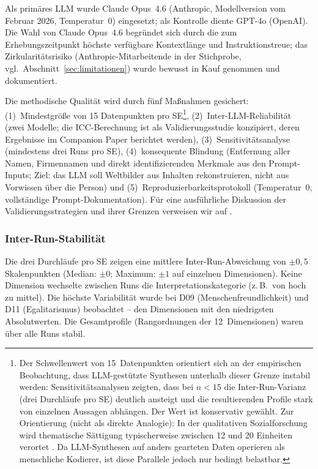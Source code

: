 \documentclass[12pt,a4paper]{article}
\begin{document}
Als prim\"ares LLM wurde Claude Opus~4.6 (Anthropic, Modellversion vom Februar 2026, Temperatur~0) eingesetzt; als Kontrolle diente GPT-4o (OpenAI). Die Wahl von Claude Opus~4.6 begr\"undet sich durch die zum Erhebungszeitpunkt h\"ochste verf\"ugbare Kontextl\"ange und Instruktionstreue; das Zirkularit\"atsrisiko (Anthropic-Mitarbeitende in der Stichprobe, vgl.\ Abschnitt~\ref{sec:limitationen}) wurde bewusst in Kauf genommen und dokumentiert.

Die methodische Qualit\"at wird durch f\"unf Ma\ss{}nahmen gesichert: (1)~Mindestgr\"o\ss{}e von 15 Datenpunkten pro SE\footnote{Der Schwellenwert von 15~Datenpunkten orientiert sich an der empirischen Beobachtung, dass LLM-gest\"utzte Synthesen unterhalb dieser Grenze instabil werden: Sensitivit\"atsanalysen zeigten, dass bei $n < 15$ die Inter-Run-Varianz (drei Durchl\"aufe pro SE) deutlich ansteigt und die resultierenden Profile stark von einzelnen Aussagen abh\"angen. Der Wert ist konservativ gew\"ahlt. Zur Orientierung (nicht als direkte Analogie): In der qualitativen Sozialforschung wird thematische S\"attigung typischerweise zwischen 12 und 20 Einheiten verortet \citep{Guest2006, FugardPotts2015}. Da LLM-Synthesen auf anders gearteten Daten operieren als menschliche Kodierer, ist diese Parallele jedoch nur bedingt belastbar.}, (2)~Inter-LLM-Reliabilit\"at (zwei Modelle; die ICC-Berechnung ist als Validierungsstudie konzipiert, deren Ergebnisse im Companion Paper berichtet werden), (3)~Sensitivit\"atsanalyse (mindestens drei Runs pro SE), (4)~konsequente Blindung (Entfernung aller Namen, Firmennamen und direkt identifizierenden Merkmale aus den Prompt-Inputs; Ziel: das LLM soll Weltbilder aus Inhalten rekonstruieren, nicht aus Vorwissen \"uber die Person) und (5)~Reproduzierbarkeitsprotokoll (Temperatur~0, vollst\"andige Prompt-Dokumentation). F\"ur eine ausf\"uhrliche Diskussion der Validierungsstrategien und ihrer Grenzen verweisen wir auf \citet{Geiger2026SWR}.

\subsubsection{Inter-Run-Stabilit\"at}

Die drei Durchl\"aufe pro SE zeigen eine mittlere Inter-Run-Abweichung von $\pm 0{,}5$ Skalenpunkten (Median: $\pm 0$; Maximum: $\pm 1$ auf einzelnen Dimensionen). Keine Dimension wechselte zwischen Runs die Interpretationskategorie (z.\,B.\ von \glqq hoch\grqq{} zu \glqq mittel\grqq). Die h\"ochste Variabilit\"at wurde bei D09 (Menschenfreundlichkeit) und D11 (Egalitarismus) beobachtet -- den Dimensionen mit den niedrigsten Absolutwerten. Die Gesamtprofile (Rang\-ordnungen der 12~Dimensionen) waren \"uber alle Runs stabil.
\end{document}
